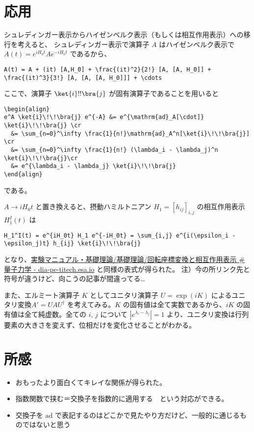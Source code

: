 \documentclass[dvipdfmx]{jsarticle}
\begin{document}
\hypertarget{ux5fdcux7528}{%
\section{応用}\label{ux5fdcux7528}}

シュレディンガー表示からハイゼンベルク表示（もしくは相互作用表示）への移行を考えると、
シュレディンガー表示で演算子 \(A\) はハイゼンベルク表示で
\(A(t) = e^{iH_0t} A e^{-iH_0t}\) であるから、

\begin{verbatim}
A(t) = A + (it) [A,H_0] + \frac{(it)^2}{2!} [A, [A, H_0]] + \frac{(it)^3}{3!} [A, [A, [A, H_0]]] + \cdots
\end{verbatim}

ここで、演算子 \(\ket{i}\\!\\!\bra{j}\) が固有演算子であることを用いると

\begin{verbatim}
\begin{align}
e^A \ket{i}\!\!\bra{j} e^{-A} &= e^{\mathrm{ad}_A[\cdot]} \ket{i}\!\!\bra{j} \cr
  &= \sum_{n=0}^\infty \frac{1}{n!}\mathrm{ad}_A^n[\ket{i}\!\!\bra{j}] \cr
  &= \sum_{n=0}^\infty \frac{1}{n!} (\lambda_i - \lambda_j)^n \ket{i}\!\!\bra{j}\cr
  &= e^{\lambda_i - \lambda_j} \ket{i}\!\!\bra{j}
\end{align}
\end{verbatim}

である。

\(A \to i H_0 t\) と置き換えると、摂動ハミルトニアン
\(H_1 = [h_{ij}]_{i,j}\) の相互作用表示 \(H_1^I(t)\) は

\begin{verbatim}
H_1^I(t) = e^{iH_0t} H_1 e^{-iH_0t} = \sum_{i,j} e^{i(\epsilon_i - \epsilon_j)t} h_{ij} \ket{i}\!\!\bra{j}
\end{verbatim}

となり、\href{https://dia-pe-titech.esa.io/posts/406}{実験マニュアル・基礎理論/基礎理論/回転座標変換と相互作用表示
\#量子力学 - dia-pe-titech.esa.io} と同様の表式が得られた。
注）今の所リンク先と符号が違うけど、向こうの記事が間違ってる\ldots{}

また、エルミート演算子 \(K\) としてユニタリ演算子 \(U=\exp(iK)\)
によるユニタリ変換\(A' = UAU^\dagger\) を考えてみる。\(K\)
の固有値は全て実数であるから、\(iK\) の固有値は全て純虚数。全ての \(i\),
\(j\) について \(|e^{\lambda_i - \lambda_j}|=1\)
より、ユニタリ変換は行列要素の大きさを変えず、位相だけを変化させることがわかる。

\hypertarget{ux6240ux611f}{%
\section{所感}\label{ux6240ux611f}}

\begin{itemize}
\tightlist
\item
  おもったより面白くてキレイな関係が得られた。
\item
  指数関数で挟む＝交換子を指数的に適用する　という対応ができる。
\item
  交換子を \(\mathrm{ad}\)
  で表記するのはどこかで見たやり方だけど、一般的に通じるものではないと思う
\end{itemize}
\end{document}
